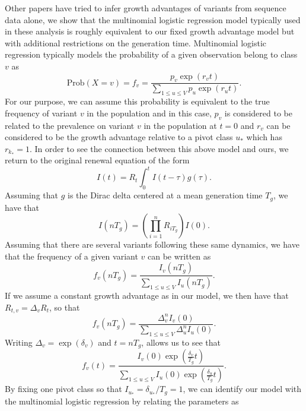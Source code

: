 \documentclass[12pt]{article}
\begin{document}
Other papers have tried to infer growth advantages of variants from sequence data alone, we show that the multinomial logistic regression model typically used in these analysis is roughly equivalent to our fixed growth advantage model but with additional restrictions on the generation time. 
Multinomial logistic regression typically models the probability of a given observation belong to class $v$ as
\begin{equation}
  \text{Prob}(X = v) = f_{v} = \frac{p_{v}\exp(r_{v} t)}{\sum_{1\leq u\leq V} p_{u}\exp(r_{u} t)}.
\end{equation}
For our purpose, we can assume this probability is equivalent to the true frequency of variant $v$ in the population and in this case, $p_{v}$ is considered to be related to the prevalence on variant $v$ in the population at $t=0$ and $r_{v}$ can be considered to be the growth advantage relative to a pivot class $u_{*}$ which has $r_{k_{*}} = 1$.
In order to see the connection between this above model and ours, we return to the original renewal equation of the form
\begin{equation}
  I(t) = R_{t}\int_{0}^{t} I(t-\tau) g(\tau).
\end{equation}
Assuming that $g$  is the Dirac delta centered at a mean generation time $T_{g}$, we have that
\begin{equation}
  I(nT_{g}) = \left(\prod_{i=1}^{n} R_{iT_{g}}\right) I(0).
\end{equation}
Assuming that there are several variants following these same dynamics, we have that the frequency of a given variant $v$ can be written as
\begin{equation}
  f_{v}(nT_{g}) = \frac{I_{v}(nT_{g})}{\sum_{1\leq u \leq V} I_{u}(nT_{g})}.
\end{equation}
If we assume a constant growth advantage as in our model, we then have that $R_{t,v} = \Delta_{v} R_{t}$, so that
\begin{equation}
  f_{v}(nT_{g}) =  \frac{\Delta_{v}^{n} I_{v}(0)}{\sum_{1\leq u \leq V} \Delta_{u}^{n} I_{u}(0)}.
\end{equation}
Writing $\Delta_{v} = \exp(\delta_{v})$ and $t = n T_{g}$, allows us to see that
\begin{equation}
  f_{v}(t) = \frac{I_{v}(0) \exp(\frac{\delta_{v}}{T_{g}} t)}{\sum_{1\leq u \leq V}I_{u}(0) \exp(\frac{\delta_{u}}{T_{g}} t)}.
\end{equation}
By fixing one pivot class so that $I_{u_{*}} = \delta_{u_{*}} / T_{g} = 1$, we can identify our model with the multinomial logistic regression by relating the parameters as 
\end{document}
